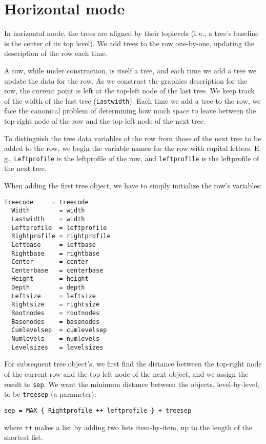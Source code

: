 \documentclass[11pt,english,BCOR10mm,DIV12,bibliography=totoc,parskip=false,smallheadings
    headexclude,footexclude,oneside]{pst-doc}
\begin{document}
\section{Horizontal mode}

  In horizontal mode, the trees are aligned by their toplevels  (i.\,e., a tree's baseline is the 
  center of its top level). We add trees to the row one-by-one, updating the description of the row each time.

  A row, while under construction, is itself a tree, and each time we add a tree we update 
  the data for the row. As we construct the graphics description for the row, the current 
  point is left at the top-left node of the last tree. We keep track of the width of the 
  last tree (\verb=Lastwidth=). Each time we add a tree to the row, we face the canonical problem 
  of determining how much space to leave between the top-right node of the row and the 
  top-left node of the next tree.

  To distinguish the tree data variables of the row from those of the next tree to be added 
  to the row, we begin the variable names for the row with capital letters. E.\,g., \verb|Leftprofile| 
  is the leftprofile of the row, and \verb|leftprofile| is the leftprofile of the next tree.

  When adding the first tree object, we have to simply initialize the row's variables:
\begin{lstlisting}[style=syntax]
  Treecode     = treecode
  Width        = width
  Lastwidth    = width
  Leftprofile  = leftprofile
  Rightprofile = rightprofile
  Leftbase     = leftbase
  Rightbase    = rightbase
  Center       = center
  Centerbase   = centerbase
  Height       = height
  Depth        = depth
  Leftsize     = leftsize
  Rightsize    = rightsize
  Rootnodes    = rootnodes
  Basenodes    = basenodes
  Cumlevelsep  = cumlevelsep
  Numlevels    = numlevels
  Levelsizes   = levelsizes
\end{lstlisting}

 For subsequent tree object's, we first find the distance between the top-right node of the 
 current row and the top-left node of the next object, and we assign the result to \verb|sep|. 
 We want the minimum distance between the objects, level-by-level, to be \verb|treesep| (a parameter):
\begin{lstlisting}[style=syntax]
  sep = MAX { Rightprofile ++ leftprofile } + treesep
\end{lstlisting}
where \verb|++| makes a list by adding two lists item-by-item, up to the length of the shortest list.
\end{document}
